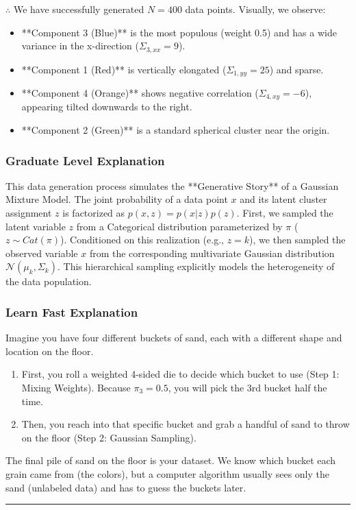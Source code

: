 \documentclass{article}
\begin{document}
\subsubsection*{\normalfont}{$\therefore$ }
We have successfully generated $N=400$ data points. Visually, we observe:
\begin{itemize}
    \item **Component 3 (Blue)** is the most populous (weight 0.5) and has a wide variance in the x-direction ($\Sigma_{3,xx}=9$).
    \item **Component 1 (Red)** is vertically elongated ($\Sigma_{1,yy}=25$) and sparse.
    \item **Component 4 (Orange)** shows negative correlation ($\Sigma_{4, xy} = -6$), appearing tilted downwards to the right.
    \item **Component 2 (Green)** is a standard spherical cluster near the origin.
\end{itemize}

\subsubsection*{Graduate Level Explanation}
This data generation process simulates the **Generative Story** of a Gaussian Mixture Model. The joint probability of a data point $x$ and its latent cluster assignment $z$ is factorized as $p(x, z) = p(x|z)p(z)$. 
First, we sampled the latent variable $z$ from a Categorical distribution parameterized by $\pi$ ($z \sim Cat(\pi)$). Conditioned on this realization (e.g., $z=k$), we then sampled the observed variable $x$ from the corresponding multivariate Gaussian distribution $\mathcal{N}(\mu_k, \Sigma_k)$. This hierarchical sampling explicitly models the heterogeneity of the data population.

\subsubsection*{Learn Fast Explanation}
Imagine you have four different buckets of sand, each with a different shape and location on the floor.
\begin{enumerate}
    \item First, you roll a weighted 4-sided die to decide which bucket to use (Step 1: Mixing Weights). Because $\pi_3=0.5$, you will pick the 3rd bucket half the time.
    \item Then, you reach into that specific bucket and grab a handful of sand to throw on the floor (Step 2: Gaussian Sampling).
\end{enumerate}
The final pile of sand on the floor is your dataset. We know which bucket each grain came from (the colors), but a computer algorithm usually sees only the sand (unlabeled data) and has to guess the buckets later.
\noindent\rule{\textwidth}{0.4pt}\\
\end{document}
